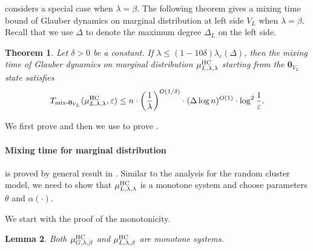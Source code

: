 \documentclass[11pt,a4paper]{article}
\renewcommand{\epsilon}{\varepsilon}
\newtheorem{theorem}{Theorem}[section]
\newtheorem{lemma}[theorem]{Lemma}
\theoremstyle{definition}
\def\*#1{\mathbf{#1}} %
\begin{document}
 considers a special case when $\lambda=\beta$. 
The following theorem gives a mixing time bound of Glauber dynamics on marginal distribution at left side $V_L$ when $\lambda = \beta$. Recall that we use $\Delta$ to denote the maximum degree $\Delta_L$ on the left side.
\begin{theorem}\label{thm:bhc-mixing-time-marginal}
     Let $\delta > 0$ be a constant. If $\lambda\leq (1-10\delta)\lambda_c(\Delta)$, then the mixing time of Glauber dynamics on marginal distribution $\mu_{L,\lambda,\lambda}^{\textnormal{HC}}$ starting from the $\*0_{V_L}$ state satisfies
    \begin{align*}
    T_{\textnormal{mix-}\*0_{V_L}}(\mu_{L,\lambda,\lambda}^{\textnormal{HC}},\epsilon)\leq n \cdot \left(\frac{1}{\lambda}\right)^{O(1/\delta)} \cdot ({\Delta\log n})^{O(1)}\cdot \log^2\frac{1}{\epsilon}.
    \end{align*}
    \end{theorem}

We first prove  and then we use  to prove .

\paragraph{Mixing time for marginal distribution}
 is proved by general result in . Similar to the analysis for the random cluster model, we need to show that $\mu_{L,\lambda,\lambda}^{\textnormal{HC}}$ is a monotone system and choose parameters $\theta$ and $\alpha(\cdot)$. 

We start with the proof of the monotonicity. 
\begin{lemma}\label{lem:bhc-monotone}
    Both $\mu_{G,\lambda,\beta}^{\textnormal{HC}}$ and $\mu_{L,\lambda,\beta}^{\textnormal{HC}}$ are monotone systems.  
    \end{lemma}
    
\end{document}
